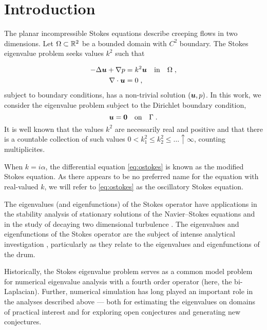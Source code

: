 \section{Introduction}

The planar incompressible Stokes equations describe
creeping flows in two dimensions.
%
Let $\Omega \subset \mathbb{R}^2$
be a bounded domain with $C^2$ boundary.
%
The Stokes eigenvalue problem seeks
values $k^2$ such that 

\begin{equation}
\begin{aligned}
  -\Delta {\boldsymbol u} + \nabla p &= k^2 {\boldsymbol u} \quad \textrm{in} \quad
  \Omega \label{eq:ostokes} \; , \\
  \nabla \cdot {\boldsymbol u} &= 0 \; ,
\end{aligned}
\end{equation}
subject to boundary conditions, has a non-trivial solution $({\boldsymbol u},p)$.
%
In this work, we consider the eigenvalue problem subject to 
the Dirichlet boundary condition,
\begin{equation}
  {\boldsymbol u} = {\boldsymbol 0} \quad \textrm{on} \quad \Gamma \label{eq:ostokes_dir} \; .
\end{equation}
It is well known that the values $k^2$ are necessarily
real and positive and that there is a countable collection of such
values $0 < k_{1}^{2} \leq k_{2}^2 \leq \ldots \uparrow \infty$,
counting multiplicites.

\begin{remark}
  When $k = i\alpha$, the differential equation
  \cref{eq:ostokes} is known as the modified Stokes
  equation. As there appears to be no preferred
  name for the equation with real-valued $k$,
  we will refer to \cref{eq:ostokes} as the
  oscillatory Stokes equation.
\end{remark}

The eigenvalues (and eigenfunctions)
of the Stokes operator have applications in the
stability analysis of stationary solutions of the
Navier--Stokes equations \cite{osborn1976approximation}
and in the study of decaying two dimensional turbulence
\cite{schneider2008final}.
%
The eigenvalues and eigenfunctions of the Stokes
operator are the subject of intense analytical
investigation
\cite{taylor1933buckling,szego1950membranes,
  polya1951isoperimetric,bramble1963pointwise,
  ashbaugh1996fundamental,leriche2004stokes,
  kelliher2009eigenvalues,antunes2011buckling},
particularly as they relate to the eigenvalues and
eigenfunctions of the drum.

Historically, the Stokes eigenvalue problem serves as a
common model problem for numerical eigenvalue analysis
with a fourth order operator (here, the bi-Laplacian).
%
Further, numerical simulation has long played an
important role in the analyses described above --- both for
estimating the eigenvalues on domains of practical
interest and for exploring open conjectures
and generating new conjectures.

